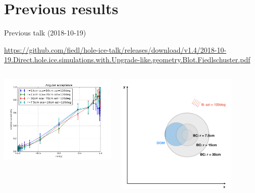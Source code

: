 \section{Previous results}
\begin{frame}[fragile]{Previous talk (2018-10-19)}

  \tiny \url{https://github.com/fiedl/hole-ice-talk/releases/download/v1.4/2018-10-19.Direct.hole.ice.simulations.with.Upgrade-like.geometry.Blot.Fiedlschuster.pdf} \normalsize

  \begin{columns}
    \begin{column}{0.5\textwidth}
      \includegraphics[width=\textwidth]{img/summer_scenario_azi120deg_previously}
    \end{column}
    \begin{column}{0.5\textwidth}
      \includegraphics[width=0.8\textwidth]{img/summerscenario-006}
    \end{column}
  \end{columns}


\end{frame}
